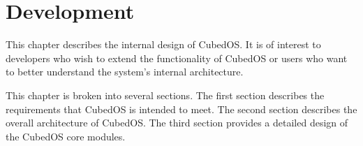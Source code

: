
\newpage
\chapter{Development}
\label{chapt:development}

This chapter describes the internal design of CubedOS. It is of interest to developers who wish
to extend the functionality of CubedOS or users who want to better understand the system's
internal architecture.

This chapter is broken into several sections. The first section describes the requirements that
CubedOS is intended to meet. The second section describes the overall architecture of CubedOS.
The third section provides a detailed design of the CubedOS core modules.




